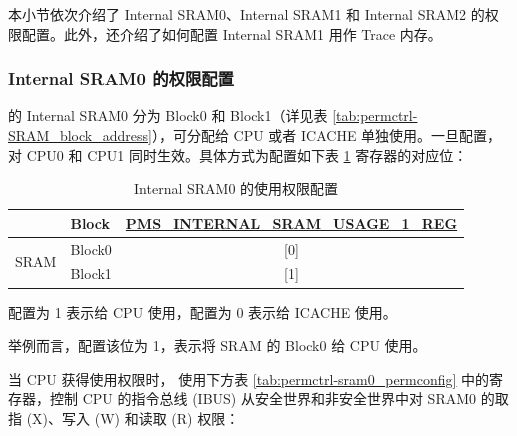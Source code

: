 \documentclass[main\_\_CN.tex]{subfiles}
\begin{document}
本小节依次介绍了 Internal SRAM0、Internal SRAM1 和 Internal SRAM2 的权限配置。此外，还介绍了如何配置 Internal SRAM1 用作 Trace 内存。

\subsubsection{Internal SRAM0 的权限配置}\label{sec:permctrl_sram0}

\chipname{} 的 Internal SRAM0 分为 Block0 和 Block1（详见表 \ref{tab:permctrl-SRAM_block_address}），可分配给 CPU 或者 ICACHE 单独使用。一旦配置，对 CPU0 和 CPU1 同时生效。具体方式为配置如下表 \ref{tab:permctrl-sram0_accessconfig} 寄存器的对应位：

\begin{table}[H]
    \centering
    \caption{Internal SRAM0 的使用权限配置}
    \label{tab:permctrl-sram0_accessconfig}
    \begin{threeparttable}
    \begin{tabular}{|l|l|c|}
    \hline
    \rowcolor{lightgray}
                          &\textbf{Block}  & \textbf{\hyperref[regdesc:PMSINTERNALSRAMUSAGE1REG]{PMS\_INTERNAL\_SRAM\_USAGE\_1\_REG\tnote{A}}}\\\hline
    \multirow{2}{*}{SRAM} & Block0        & [0] \tnote{B}\\\cline{2-3}
                          & Block1        & [1] \\\hline
    \end{tabular}
    \begin{tablenotes}
        \item[A] 配置为 1 表示给 CPU 使用，配置为 0 表示给 ICACHE 使用。
        \item[B] 举例而言，配置该位为 1，表示将 SRAM 的 Block0 给 CPU 使用。
        \end{tablenotes}
    \end{threeparttable}
\end{table}

当 CPU 获得使用权限时，\chipname{} 使用下方表 \ref{tab:permctrl-sram0_permconfig} 中的寄存器，控制 CPU 的指令总线 (IBUS) 从安全世界和非安全世界中对 SRAM0 的取指 (X)、写入 (W) 和读取 (R) 权限：
\end{document}
